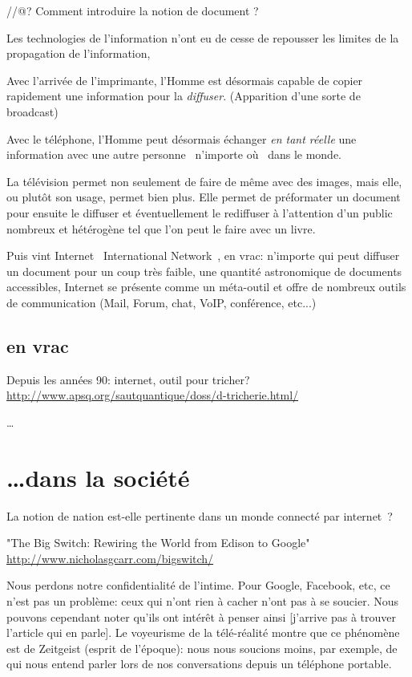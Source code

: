 //@? Comment introduire la notion de document ?

Les technologies de l'information n'ont eu de cesse de repousser les limites de
la propagation de l'information, 

Avec l'arrivée de l'imprimante, l'Homme est désormais capable de copier
rapidement une information pour la \emph{diffuser}. (Apparition d'une sorte
de broadcast)

Avec le téléphone, l'Homme peut désormais échanger \emph{en tant réelle} une 
information avec une autre personne \og{}~n'importe où~\fg{} dans le monde.

La télévision permet non seulement de faire de même avec des images, mais elle,
ou plutôt son usage, permet bien plus. Elle permet de préformater un document pour ensuite le
diffuser et éventuellement le rediffuser à l'attention d'un public nombreux et
hétérogène tel que l'on peut le faire avec un livre.

Puis vint Internet \og{}~International Network~\fg{}, en vrac: n'importe qui
peut diffuser un document pour un coup très faible, une quantité astronomique
de documents accessibles, Internet se présente comme un méta-outil et offre de
nombreux outils de communication (Mail, Forum, chat, VoIP, conférence, etc...)

\subsection{en vrac}



Depuis les années 90: internet, outil pour tricher?
\url{http://www.apsq.org/sautquantique/doss/d-tricherie.html/}

\ldots

\section{\ldots dans la société}

La notion de nation est-elle pertinente dans un monde connecté par
internet~?

"The Big Switch: Rewiring the World from Edison to Google" 
 \url{http://www.nicholasgcarr.com/bigswitch/}

Nous perdons notre confidentialité de l'intime. Pour Google, Facebook, etc, 
ce n'est pas un problème: ceux qui n'ont rien à cacher n'ont pas à se soucier. Nous
pouvons cependant noter qu'ils ont intérêt à penser ainsi [j'arrive pas à 
trouver l'article qui en parle]. Le voyeurisme de la télé-réalité montre 
que ce phénomène est de Zeitgeist (esprit de l'époque): nous nous soucions 
moins, par exemple, de qui nous entend parler lors de nos
conversations depuis un téléphone portable.

